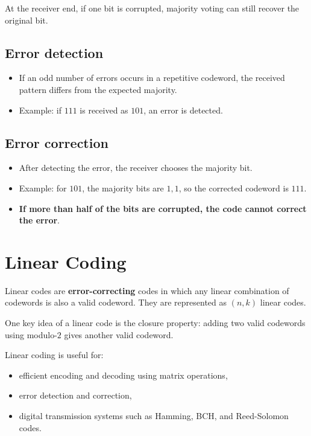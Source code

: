 \documentclass[11pt,a4paper]{book}
\newenvironment{definitionbox}[1][Definition]{%
    \begin{tcolorbox}[
        enhanced,
        breakable,
        colback=primaryblue!10,
        colframe=primaryblue!150,
        title=#1,
        fonttitle=\bfseries,
        sharp corners,
        boxrule=0.8pt,
        left=8pt,
        right=8pt,
        top=6pt,
        bottom=6pt
    ]
}{\end{tcolorbox}}
\newenvironment{infobox}[1][Information]{%
    \begin{tcolorbox}[
        enhanced,
        breakable,
        colback=mintgreen!10,
        colframe=mintgreen!200,
        title=#1,
        fonttitle=\bfseries,
        sharp corners,
        boxrule=0.8pt,
        left=8pt,
        right=8pt,
        top=6pt,
        bottom=6pt
    ]
}{\end{tcolorbox}}
\begin{document}
At the receiver end, if one bit is corrupted, majority voting can still recover the original bit.

\subsection{Error detection}
\begin{itemize}
    \item If an odd number of errors occurs in a repetitive codeword, the received pattern differs from the expected majority.
    \item Example: if \(111\) is received as \(101\), an error is detected.
\end{itemize}

\subsection{Error correction}
\begin{itemize}
    \item After detecting the error, the receiver chooses the majority bit.
    \item Example: for \(101\), the majority bits are \(1,1\), so the corrected codeword is \(111\).
    \item \textbf{If more than half of the bits are corrupted, the code cannot correct the error}.
\end{itemize}

\section{Linear Coding}

\begin{definitionbox}[Linear Code]
Linear codes are \textbf{error-correcting} codes in which any linear combination of codewords is also a valid codeword. They are represented as \((n,k)\) linear codes.
\end{definitionbox}

\begin{infobox}[Core ideas]
One key idea of a linear code is the closure property: adding two valid codewords using modulo-\(2\) gives another valid codeword.\\
\par\vspace{\baselineskip}
Linear coding is useful for:
\begin{itemize}
    \item efficient encoding and decoding using matrix operations,
    \item error detection and correction,
    \item digital transmission systems such as Hamming, BCH, and Reed-Solomon codes.
\end{itemize}
\end{infobox}
\end{document}
